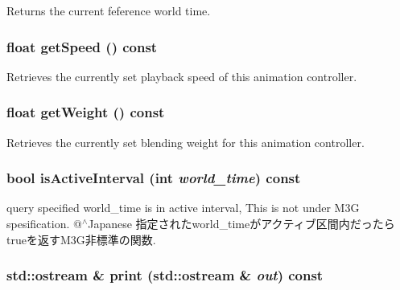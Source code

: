 Returns the current feference world time. \hypertarget{classm3g_1_1AnimationController_4ab87c5df7c3eadd17b318a426773fcb}{
\subsubsection[{getSpeed}]{\setlength{\rightskip}{0pt plus 5cm}float getSpeed () const}}
\label{classm3g_1_1AnimationController_4ab87c5df7c3eadd17b318a426773fcb}


Retrieves the currently set playback speed of this animation controller. \hypertarget{classm3g_1_1AnimationController_a17d38dafd3d75c59f0609f037fbe5ae}{
\subsubsection[{getWeight}]{\setlength{\rightskip}{0pt plus 5cm}float getWeight () const}}
\label{classm3g_1_1AnimationController_a17d38dafd3d75c59f0609f037fbe5ae}


Retrieves the currently set blending weight for this animation controller. \hypertarget{classm3g_1_1AnimationController_8db30a5f125f5b22a1cde9e41d93c2f0}{
\subsubsection[{isActiveInterval}]{\setlength{\rightskip}{0pt plus 5cm}bool isActiveInterval (int {\em world\_\-time}) const}}
\label{classm3g_1_1AnimationController_8db30a5f125f5b22a1cde9e41d93c2f0}


query specified world\_\-time is in active interval, This is not under M3G spesification. @$^\wedge$Japanese 指定されたworld\_\-timeがアクティブ区間内だったらtrueを返すM3G非標準の関数. \hypertarget{classm3g_1_1AnimationController_6fea17fa1532df3794f8cb39cb4f911f}{
\subsubsection[{print}]{\setlength{\rightskip}{0pt plus 5cm}std::ostream \& print (std::ostream \& {\em out}) const}}
\label{classm3g_1_1AnimationController_6fea17fa1532df3794f8cb39cb4f911f}



